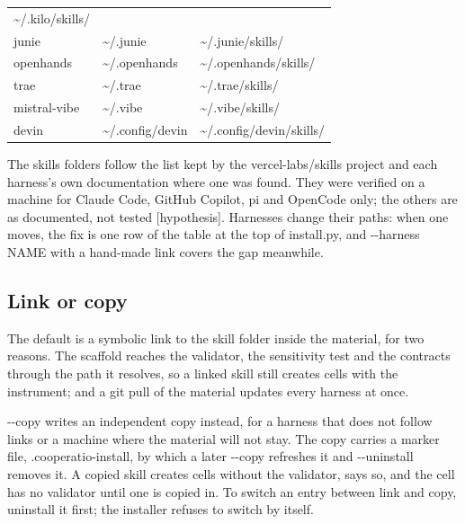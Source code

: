 \documentclass[
  american,
  10pt,
]{report}
\renewcommand{\texttt}[1]{{\ttfamily\hyphenchar\font=-1 #1}}
\begin{document}
{\begin{longtable}[]{@{}lll@{}}
\texttt{\textasciitilde{}/\allowbreak{}.\allowbreak{}kilo/\allowbreak{}skills/\allowbreak{}} \\
\texttt{junie} &
\texttt{\textasciitilde{}/\allowbreak{}.\allowbreak{}junie} &
\texttt{\textasciitilde{}/\allowbreak{}.\allowbreak{}junie/\allowbreak{}skills/\allowbreak{}} \\
\texttt{openhands} &
\texttt{\textasciitilde{}/\allowbreak{}.\allowbreak{}openhands} &
\texttt{\textasciitilde{}/\allowbreak{}.\allowbreak{}openhands/\allowbreak{}skills/\allowbreak{}} \\
\texttt{trae} &
\texttt{\textasciitilde{}/\allowbreak{}.\allowbreak{}trae} &
\texttt{\textasciitilde{}/\allowbreak{}.\allowbreak{}trae/\allowbreak{}skills/\allowbreak{}} \\
\texttt{mistral-\allowbreak{}vibe} &
\texttt{\textasciitilde{}/\allowbreak{}.\allowbreak{}vibe} &
\texttt{\textasciitilde{}/\allowbreak{}.\allowbreak{}vibe/\allowbreak{}skills/\allowbreak{}} \\
\texttt{devin} &
\texttt{\textasciitilde{}/\allowbreak{}.\allowbreak{}config/\allowbreak{}devin}
&
\texttt{\textasciitilde{}/\allowbreak{}.\allowbreak{}config/\allowbreak{}devin/\allowbreak{}skills/\allowbreak{}} \\
\end{longtable}
}

The skills folders follow the list kept by the vercel-labs/skills
project and each harness's own documentation where one was found. They
were verified on a machine for Claude Code, GitHub Copilot, pi and
OpenCode only; the others are as documented, not tested
\texttt{[hypothesis]}. Harnesses change their paths: when one moves, the
fix is one row of the table at the top of
\texttt{install.\allowbreak{}py}, and
\texttt{-\allowbreak{}-\allowbreak{}harness NAME} with a hand-made link
covers the gap meanwhile.

\subsection{Link or copy}\label{link-or-copy}

The default is a symbolic link to the skill folder inside the material,
for two reasons. The scaffold reaches the validator, the sensitivity
test and the contracts through the path it resolves, so a linked skill
still creates cells with the instrument; and a \texttt{git pull} of the
material updates every harness at once.

\texttt{-\allowbreak{}-\allowbreak{}copy} writes an independent copy
instead, for a harness that does not follow links or a machine where the
material will not stay. The copy carries a marker file,
\texttt{.\allowbreak{}cooperatio-\allowbreak{}install}, by which a later
\texttt{-\allowbreak{}-\allowbreak{}copy} refreshes it and
\texttt{-\allowbreak{}-\allowbreak{}uninstall} removes it. A copied
skill creates cells without the validator, says so, and the cell has no
validator until one is copied in. To switch an entry between link and
copy, uninstall it first; the installer refuses to switch by itself.
\end{document}
